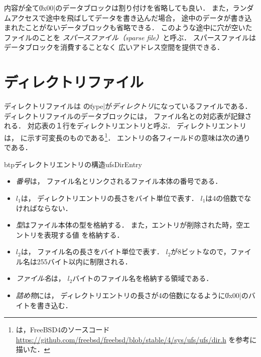 内容が全て\|0x00|のデータブロックは割り付けを省略しても良い．
また，ランダムアクセスで途中を飛ばしてデータを書き込んだ場合，
途中のデータが書き込まれたことがないデータブロックも省略できる．
このような途中に穴が空いたファイルのことを
\emph{スパースファイル（sparse file）}と呼ぶ．
スパースファイルはデータブロックを消費することなく
広いアドレス空間を提供できる．

\section{ディレクトリファイル}
ディレクトリファイルは
\inode の\|type|が\emph{ディレクトリ}になっているファイルである．
ディレクトリファイルのデータブロックには，
ファイル名と\inode の対応表が記録される．
対応表の１行をディレクトリエントリと呼ぶ．
ディレクトリエントリは，
に示す可変長のものである\footnote{
は，FreeBSD4のソースコード
\url{https://github.com/freebsd/freebsd/blob/stable/4/sys/ufs/ufs/dir.h}
を参考に描いた．
}．
エントリの各フィールドの意味は次の通りである．

\begin{myfig}{btp}{ディレクトリエントリの構造}{ufsDirEntry}
\end{myfig}

\begin{itemize}
\item  \emph{\inode 番号}は，
  ファイル名とリンクされるファイル本体の\inode 番号である．
\item \emph{$l_1$}は，
  ディレクトリエントリの長さをバイト単位で表す．
  $l_1$は4の倍数でなければならない．
\item \emph{型}はファイル本体の型を格納する．
  また，エントリが削除された時，空エントリを表現する値%
  を格納する．
\item \emph{$l_2$}は，
  ファイル名の長さをバイト単位で表す．
  $l_2$が8ビットなので，ファイル名は255バイト以内に制限される．
\item \emph{ファイル名}は，
  $l_2$バイトのファイル名を格納する領域である．
\item \emph{詰め物}には，
  ディレクトリエントリの長さが4の倍数になるように\|0x00|のバイトを書き込む．
\end{itemize}

